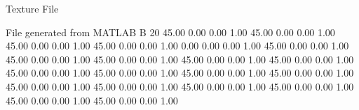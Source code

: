 Texture File

File generated from MATLAB
B 20
   45.00   0.00   0.00   1.00
   45.00   0.00   0.00   1.00
   45.00   0.00   0.00   1.00
   45.00   0.00   0.00   1.00
   0.00   0.00   0.00   1.00
   45.00   0.00   0.00   1.00
   45.00   0.00   0.00   1.00
   45.00   0.00   0.00   1.00
   45.00   0.00   0.00   1.00
   45.00   0.00   0.00   1.00
   45.00   0.00   0.00   1.00
   45.00   0.00   0.00   1.00
   45.00   0.00   0.00   1.00
   45.00   0.00   0.00   1.00
   45.00   0.00   0.00   1.00
   45.00   0.00   0.00   1.00
   45.00   0.00   0.00   1.00
   45.00   0.00   0.00   1.00
   45.00   0.00   0.00   1.00
   45.00   0.00   0.00   1.00
